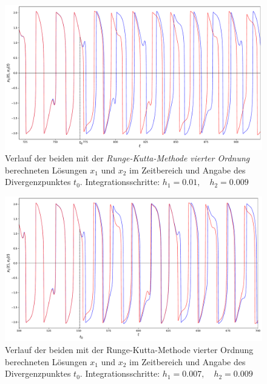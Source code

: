 \begin{figure}
\includegraphics[width=\textwidth]{papers/vanderpol/figures/RK_schritt_delta_e-3.pdf}
\caption{Verlauf der beiden mit der {\em Runge-Kutta-Methode vierter Ordnung} berechneten Lösungen $x_1$ und $x_2$ im Zeitbereich und Angabe des Divergenzpunktes $t_0$. Integrationsschritte: $h_1 = 0.01, \quad h_2 = 0.009$\label{vanderpol:figures:RK_schritt_e-3}}
\end{figure}

\begin{figure}
\includegraphics[width=\textwidth]{papers/vanderpol/figures/RK_schritt_delta_2e-3_2.pdf}
\caption{Verlauf der beiden mit der Runge-Kutta-Methode vierter Ordnung berechneten Lösungen $x_1$ und $x_2$ im Zeitbereich und Angabe des Divergenzpunktes $t_0$. Integrationsschritte: $h_1 = 0.007, \quad h_2 = 0.009$\label{vanderpol:figures:RK_schritt_2e-3}}
\end{figure}

